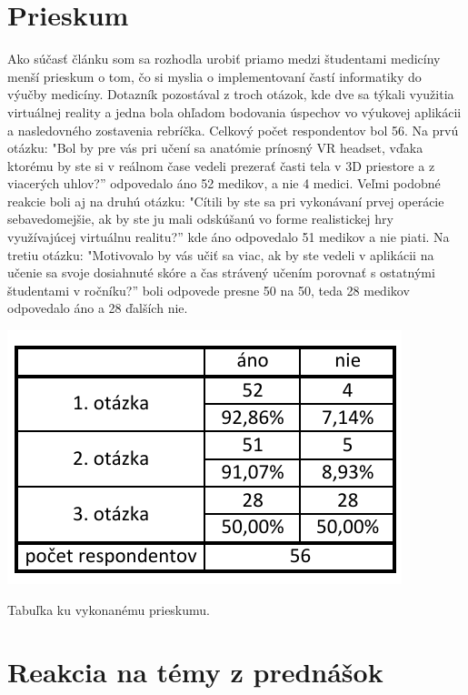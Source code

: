 \documentclass[10pt,twoside,slovak,a4paper]{article}
\begin{document}
\section{Prieskum} \label{prieskum}
Ako súčasť článku som sa rozhodla urobiť priamo medzi študentami medicíny menší prieskum o tom, čo si myslia o implementovaní častí informatiky do výučby medicíny. Dotazník pozostával z troch otázok, kde dve sa týkali využitia virtuálnej reality a jedna bola ohľadom bodovania úspechov vo výukovej aplikácii a nasledovného zostavenia rebríčka. Celkový počet respondentov bol 56. Na prvú otázku: "Bol by pre vás pri učení sa anatómie prínosný VR headset, vďaka ktorému by ste si v reálnom čase vedeli prezerať časti tela v 3D priestore a z viacerých uhlov?'' odpovedalo áno 52 medikov, a nie 4 medici. Veľmi podobné reakcie boli aj na druhú otázku: "Cítili by ste sa pri vykonávaní prvej operácie sebavedomejšie, ak by ste ju mali odskúšanú vo forme realistickej hry využívajúcej virtuálnu realitu?'' kde áno odpovedalo 51 medikov a nie piati. Na tretiu otázku: "Motivovalo by vás učiť sa viac, ak by ste vedeli v aplikácii na učenie sa svoje dosiahnuté skóre a čas strávený učením porovnať s ostatnými študentami v ročníku?'' boli odpovede presne 50 na 50, teda 28 medikov odpovedalo áno a 28 ďalších nie.


\begin{table}[hbtp]
\centering
\includegraphics[scale=0.9]{tabulkakprojektu.pdf}
\caption{Tabuľka ku vykonanému prieskumu.}
\end{table}

\section{Reakcia na témy z prednášok} \label{prednasky}
\end{document}
